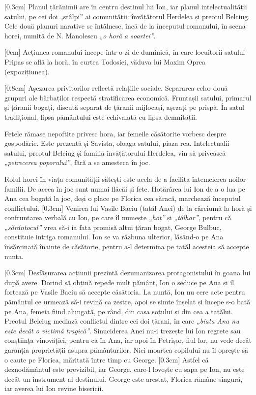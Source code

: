 \documentclass[
12pt,
a4paper
]{article}
\begin{document}
[0.3cm]
Planul țărănimii are în centru destinul lui Ion, iar planul intelectualității satului, pe cei doi „stâlpi” ai comunității: învățătorul Herdelea și preotul Belciug. Cele două planuri narative se întâlnesc, încă de la începutul romanului, în scena horei, numită de N. Manolescu \textit{„o horă a soartei”}.

[0cm]
Acțiunea romanului începe într-o zi de duminică, în care locuitorii satului Pripas se află la horă, în curtea Todosiei, văduva lui Maxim Oprea (expozițiunea).

[0.8cm]
Așezarea privitorilor reflectă relațiile sociale. Separarea celor două grupuri ale bărbaților respectă stratificarea economică. Fruntașii satului, primarul și țăranii bogați, discută separat de țăranii mijlocași, așezați pe prispă. În satul tradițional, lipsa pământului este echivalată cu lipsa demnității.

Fetele rămase nepoftite privesc hora, iar femeile căsătorite vorbesc despre gospodărie. Este prezentă și Savista, oloaga satului, piaza rea. Intelectualii satului, preotul Belciug și familia învățătorului Herdelea, vin să privească \textit{„petrecerea poporului”}, fără a se amesteca în joc.

Rolul horei în viața comunității sătești este acela de a facilita întemeierea noilor familii. De aceea în joc sunt numai flăcăi și fete. Hotărârea lui Ion de a o lua pe Ana cea bogată la joc, deși o place pe Florica cea săracă, marchează începutul conflictului.
[0.3cm]
Venirea lui Vasile Baciu (tatăl Anei) de la cârciumă la horă și confruntarea verbală cu Ion, pe care îl numește \textit{„hoț”} și \textit{„tâlhar”}, pentru că \textit{„sărăntocul”} vrea să-i ia fata promisă altui țăran bogat, George Bulbuc, constituie intriga romanului. Ion se va răzbuna ulterior, lăsând-o pe Ana însărcinată înainte de căsătorie, pentru a-l determina pe tatăl acesteia să accepte nunta.

[0.3cm]
Desfășurarea acțiunii prezintă dezumanizarea protagonistului în goana lui după avere. Dorind să obțină repede mult pământ, Ion o seduce pe Ana și îl forțează pe Vasile Baciu să accepte căsătoria. La nuntă, Ion nu cere acte pentru pământul ce urmează să-i revină ca zestre, apoi se simte înșelat și începe s-o bată pe Ana, femeia fiind alungată, pe rând, din casa soțului și din cea a tatălui. Preotul Belciug mediază conflictul dintre cei doi țărani, în care \textit{„biata Ana nu este decât o victimă tragică”}. Sinuciderea Anei nu-i trezește lui Ion regrete sau conștiința vinovăției, pentru că în Ana, iar apoi în Petrișor, fiul lor, nu vede decât garanția  proprietății asupra pământurilor. Nici moartea copilului nu îl oprește să o caute pe Florica, măritată între timp cu George.
[0.3cm]
Astfel că deznodământul este previzibil, iar George, care-l lovește cu sapa pe Ion, nu este decât un instrument al destinului. George este arestat, Florica rămâne singură, iar averea lui Ion revine bisericii.
\end{document}
